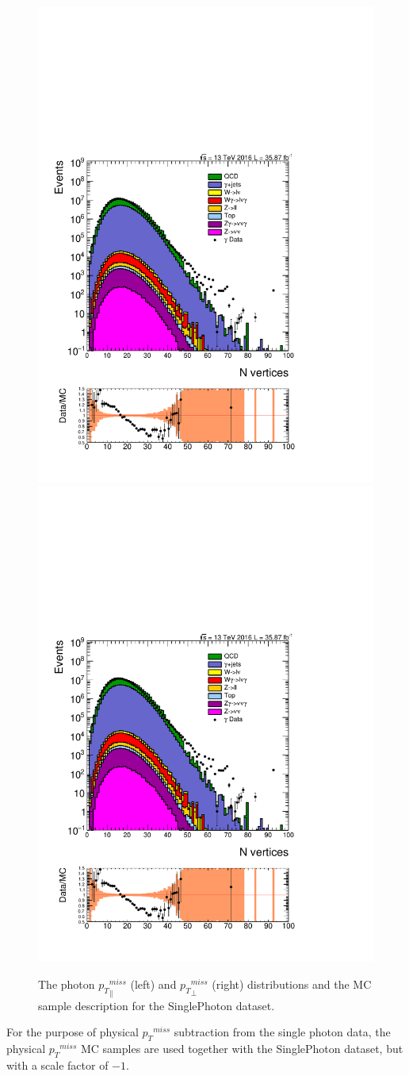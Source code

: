 \begin{figure}[htbp!]
\centering
\includegraphics[width=0.48\linewidth, page=7]{figures/ReMiniAODSummer16HLT_FixXsec_SepProc_PhPtWt_tight_puWeightsummer16_unblind_log_.pdf}
\includegraphics[width=0.48\linewidth, page=8]{figures/ReMiniAODSummer16HLT_FixXsec_SepProc_PhPtWt_tight_puWeightsummer16_unblind_log_.pdf}
\caption{The photon ${p_{T}}^{miss}_\parallel$ (left) and ${p_{T}}^{miss}_\perp$ (right) distributions and the MC sample description for the SinglePhoton dataset. }
\label{fig:pho_metpara}
\end{figure}

\vspace{0.3cm}
For the purpose of physical ${p_{T}}^{miss}$ subtraction from the single photon data, the physical ${p_{T}}^{miss}$ MC samples are used together with the SinglePhoton dataset, but with a scale factor of $-1$.

